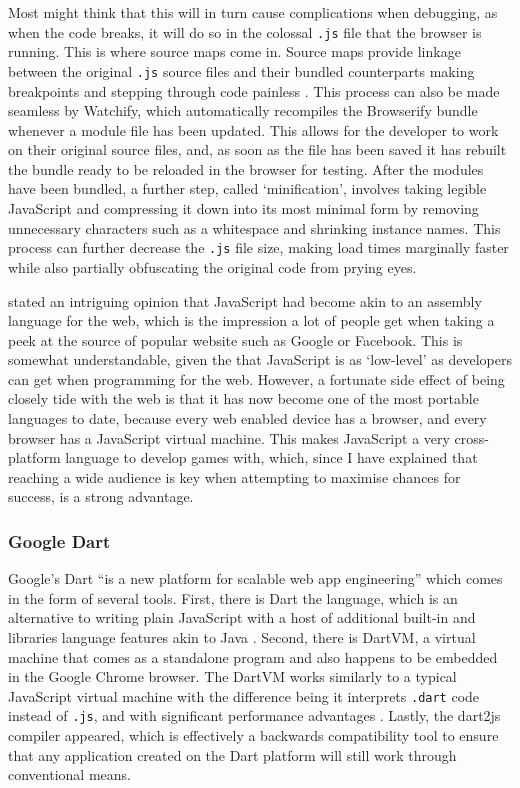\documentclass[final]{cmpreport}
\begin{document}

Most might think that this will in turn cause complications when debugging, as when the code breaks, it will do so in the colossal \texttt{.js} file that the browser is running. This is where source maps come in. Source maps provide linkage between the original \texttt{.js} source files and their bundled counterparts making breakpoints and stepping through code painless \citep{Seddon}. This process can also be made seamless by Watchify, which automatically recompiles the Browserify bundle whenever a module file has been updated. This allows for the developer to work on their original source files, and, as soon as the file has been saved it has rebuilt the bundle ready to be reloaded in the browser for testing. After the modules have been bundled, a further step, called `minification', involves taking legible JavaScript and compressing it down into its most minimal form by removing unnecessary characters such as a whitespace and shrinking instance names. This process can further decrease the \texttt{.js} file size, making load times marginally faster while also partially obfuscating the original code from prying eyes.

\cite{Hanselman} stated an intriguing opinion that JavaScript had become akin to an assembly language for the web, which is the impression a lot of people get when taking a peek at the source of popular website such as Google or Facebook. This is somewhat understandable, given the that JavaScript is as `low-level' as developers can get when programming for the web. However, a fortunate side effect of being closely tide with the web is that it has now become one of the most portable languages to date, because every web enabled device has a browser, and every browser has a JavaScript virtual machine. This makes JavaScript a very cross-platform language to develop games with, which, since I have explained that reaching a wide audience is key when attempting to maximise chances for success, is a strong advantage.

\subsubsection{Google Dart}
Google's Dart ``is a new platform for scalable web app engineering'' which comes in the form of several tools. First, there is Dart the language, which is an alternative to writing plain JavaScript with a host of additional built-in and libraries language features akin to Java \cite{Fortuna}. Second, there is DartVM, a virtual machine that comes as a standalone program and also happens to be embedded in the Google Chrome browser. The DartVM works similarly to a typical JavaScript virtual machine with the difference being it interprets \texttt{.dart} code instead of \texttt{.js}, and with significant performance advantages \cite{Schneider}. Lastly, the dart2js compiler appeared, which is effectively a backwards compatibility tool to ensure that any application created on the Dart platform will still work through conventional means.
\end{document}
